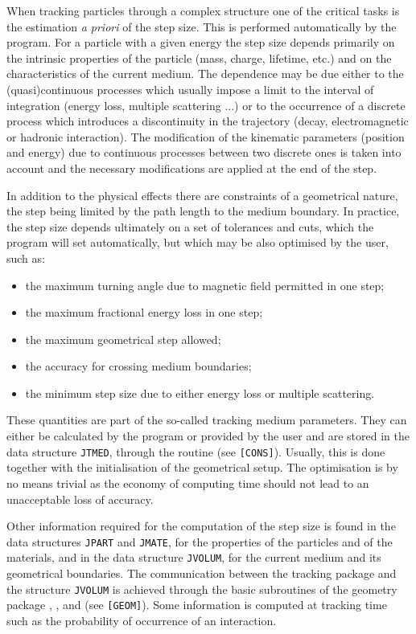 When tracking particles through a complex structure one of the
critical tasks is the estimation {\it a priori} of the step size. 
This is performed automatically by the program.
For a particle with a given energy the step size depends
primarily on the intrinsic properties of the particle (mass,
charge, lifetime, etc.) and on the characteristics of the current
medium. The dependence may be due either to the (quasi)continuous
processes which usually impose a limit to the interval
of integration (energy loss, multiple scattering ...)
or to the occurrence of a discrete process which introduces
a discontinuity in the trajectory (decay, electromagnetic or hadronic
interaction). 
The modification of the kinematic parameters (position
and energy) due to continuous processes between two discrete ones is
taken into account and the necessary modifications are applied at the end
of the step. 

In addition to the physical effects
there are constraints of a geometrical nature, the step being limited by
the path length to the medium boundary.
In practice, the step size depends ultimately on a set of tolerances and cuts,
which the program will set automatically, but which may be also
optimised by the user, such as:

\begin{itemize}
\item the maximum turning angle due to magnetic field permitted in one step;
\item the maximum fractional energy loss in one step;
\item the maximum geometrical step allowed;
\item the accuracy for crossing medium boundaries;
\item the minimum step size due to either energy loss or multiple scattering.
\end{itemize}

These quantities are part of the so-called tracking medium parameters. They
can either be calculated by the program or 
provided by the user and are stored in the
data structure {\tt JTMED}, through the routine  (see {\tt [CONS]}). 
Usually, this is done together with the initialisation of the geometrical setup.
The optimisation is by no means trivial as the economy of computing time
should not lead to an unacceptable loss of accuracy.

Other information required for the computation
of the step size is found in the data
structures {\tt JPART} and {\tt JMATE}, for the
properties of the particles and of the materials, and in the
data structure {\tt JVOLUM}, for the current medium and its geometrical
boundaries.
The communication between the tracking package and the
structure {\tt JVOLUM} is achieved through the basic subroutines of the
geometry package , ,
 and  (see {\tt [GEOM]}).
Some information is computed at tracking time
such as the probability of occurrence of an interaction. 

